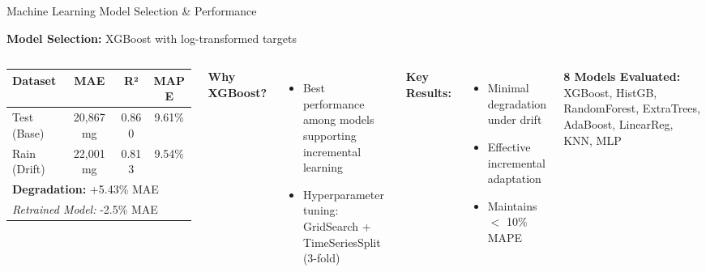 \documentclass[aspectratio=169,11pt]{beamer}
\begin{document}
\begin{frame}{Machine Learning Model Selection \& Performance}

    \textbf{Model Selection:} XGBoost with log-transformed targets

    \vspace{0.5em}
    \begin{columns}[c]
        \begin{table}
            \centering
            \small
            \begin{tabular}{lccc}
                \toprule
                \textbf{Dataset} & \textbf{MAE} & \textbf{R²} & \textbf{MAPE} \\
                \midrule
                Test (Base) & 20,867 mg & 0.860 & 9.61\% \\
                Rain (Drift) & 22,001 mg & 0.813 & 9.54\% \\
                \midrule
                \multicolumn{4}{l}{\textbf{Degradation:} +5.43\% MAE} \\
                \multicolumn{4}{l}{\textit{Retrained Model:} -2.5\% MAE} \\
                \bottomrule
            \end{tabular}
        \end{table}

        \vspace{0.3em}
        \textbf{Why XGBoost?}
        \begin{itemize}
            \item Best performance among models supporting incremental learning
            \item Hyperparameter tuning: GridSearch + TimeSeriesSplit (3-fold)
        \end{itemize}

        \textbf{Key Results:}
        \begin{itemize}
            \item Minimal degradation under drift
            \item Effective incremental adaptation
            \item Maintains $<$ 10\% MAPE
        \end{itemize}

        \vspace{0.5em}
        \textbf{8 Models Evaluated:}
        {\footnotesize XGBoost, HistGB, RandomForest, ExtraTrees, AdaBoost, LinearReg, KNN, MLP}
    \end{columns}

\end{frame}
\end{document}
